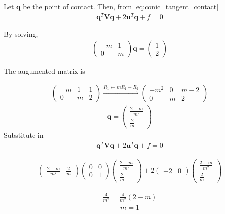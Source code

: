 \documentclass[10pt, a4paper]{article}
\newcommand{\myvec}[1]{\ensuremath{\begin{pmatrix}#1\end{pmatrix}}}
\let\vec\mathbf
\begin{document}
Let $\vec{q}$ be the point of contact.   Then, from 
  \eqref{eq:conic_tangent_contact}
\begin{align}
\vec{q}^T\vec{V}\vec{q} + 2\vec{u}^T\vec{q} + f = 0
		\label{eq:12/6/6/21/contact}
\end{align}

By solving,
\begin{align}
        \myvec{-m & 1 \\ 0 & m}\vec{q} = \myvec{1 \\ 2}
\end{align}

The augumented matrix is

\begin{align}
        \myvec{-m & 1 & 1 \\ 0 & m & 2}\xrightarrow[]{R_1 \leftarrow  mR_1 - R_2 } \myvec{-m^2 & 0 & m-2 \\ 0 & m & 2}
\end{align}
\begin{align}
        \vec{q} = \myvec{\frac{2 - m}{m^2} \\ \frac{2}{m}}
\end{align}
Substitute in
\begin{align}
        \vec{q}^T\vec{V}\vec{q} + 2\vec{u}^T\vec{q} + f = 0
\end{align}

\begin{align}
	\myvec{\frac{2 - m}{m^2} & \frac{2}{m}}\myvec{0&0\\0&1}\myvec{\frac{2 - m}{m^2} \\ \frac{2}{m}} + 2\myvec{-2 & 0}\myvec{\frac{2 - m}{m^2} \\ \frac{2}{m}}
\end{align}

\begin{align}
        \frac{4}{m^2} = \frac{4}{m^2} (2 - m)
\end{align}
\begin{align}
        m = 1
\end{align}
\end{document}
